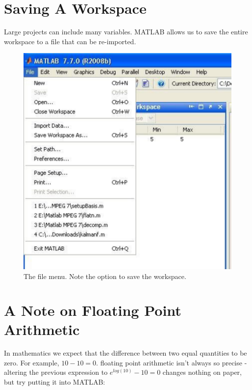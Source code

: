 \section*{Saving A Workspace}

Large projects can include many variables.  MATLAB allows us to save the entire workspace to a file that can be re-imported.


\begin{figure}
\begin{center}
	\includegraphics[scale=0.5]{saveWorkspace}
	\caption{The file menu. Note the option to save the workspace.}
\end{center}
\end{figure}

\section*{A Note on Floating Point Arithmetic}

In mathematics we expect that the difference between two equal quantities to be zero.  For example, $10 - 10 = 0$.  floating point arithmetic isn't always so precise - altering the previous expression to $e^{log(10)} - 10 = 0$ changes nothing on paper, but try putting it into MATLAB:

